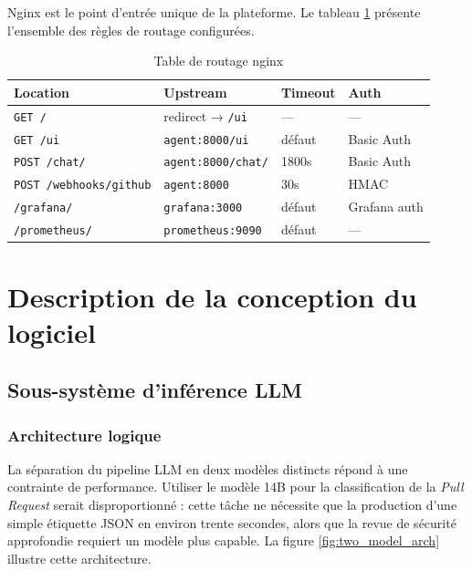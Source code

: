         Nginx est le point d'entrée unique de la plateforme. Le tableau
        \ref{tab:nginx_routing} présente l'ensemble des règles de routage configurées.

        \begin{table}[H]
        \centering
        \begin{tabular}{|m{3.5cm}|m{3.5cm}|m{2cm}|m{2cm}|}
        \hline
        \textbf{Location} & \textbf{Upstream} & \textbf{Timeout} & \textbf{Auth} \\
        \hline
        \texttt{GET /} & redirect → \texttt{/ui} & — & — \\
        \hline
        \texttt{GET /ui} & \texttt{agent:8000/ui} & défaut & Basic Auth \\
        \hline
        \texttt{POST /chat/} & \texttt{agent:8000/chat/} & 1800s & Basic Auth \\
        \hline
        \texttt{POST /\allowbreak{}webhooks/\allowbreak{}github} & \texttt{agent:8000} & 30s & HMAC \\
        \hline
        \texttt{/grafana/} & \texttt{grafana:3000} & défaut & Grafana auth \\
        \hline
        \texttt{/\allowbreak{}prometheus/} & \texttt{prometheus:9090} & défaut & — \\
        \hline
        \end{tabular}
        \caption{Table de routage nginx}
        \label{tab:nginx_routing}
        \end{table}

\section{Description de la conception du logiciel}

    \subsection{Sous-système d'inférence LLM}

        \subsubsection{Architecture logique}

        La séparation du pipeline LLM en deux modèles distincts répond à une contrainte de
        performance. Utiliser le modèle 14B pour la classification de la
        \textit{Pull Request} serait disproportionné : cette tâche ne nécessite que la
        production d'une simple étiquette JSON en environ trente secondes, alors que la revue de
        sécurité approfondie requiert un modèle plus capable. La figure
        \ref{fig:two_model_arch} illustre cette architecture.

